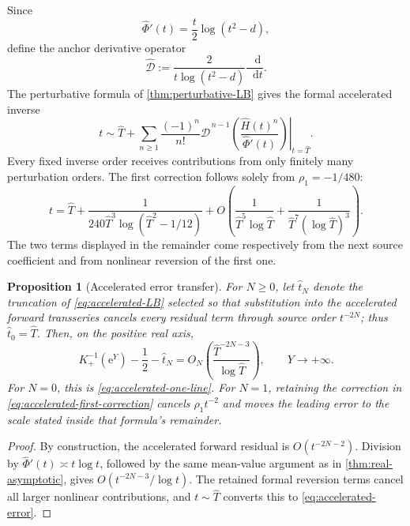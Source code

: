 \documentclass[11pt,oneside]{article}
\theoremstyle{plain}
\newtheorem{proposition}[theorem]{Proposition}
\theoremstyle{definition}
\theoremstyle{remark}
\newcommand{\e}{\mathrm{e}}
\newcommand{\dd}{\mathop{}\!\mathrm{d}}
\begin{document}
Since
\begin{equation}
 \widehat\Phi'(t)
 =\frac t2\log(t^2-d),
 \label{eq:Phihat-prime}
\end{equation}
define the anchor derivative operator
\begin{equation}
 \widehat{\mathscr D}
 :=\frac{2}{t\log(t^2-d)}\frac{\dd}{\dd t}.
 \label{eq:Dhat-def}
\end{equation}
The perturbative formula of \cref{thm:perturbative-LB} gives the formal
accelerated inverse
\begin{equation}
 t
 \sim \widehat T+
 \sum_{n\ge1}\frac{(-1)^n}{n!}
 \widehat{\mathscr D}^{\,n-1}
 \left.
 \left(
   \frac{\widehat H(t)^n}{\widehat\Phi'(t)}
 \right)\right|_{t=\widehat T}.
 \label{eq:accelerated-LB}
\end{equation}
Every fixed inverse order receives contributions from only finitely many
perturbation orders.  The first correction follows solely from
\(\rho_1=-1/480\):
\begin{equation}
 t
 =\widehat T+
 \frac{1}{240\widehat T^3\log(\widehat T^2-1/12)}
 +O\!\left(\frac{1}{\widehat T^5\log\widehat T}
           +\frac{1}{\widehat T^7(\log\widehat T)^3}\right).
 \label{eq:accelerated-first-correction}
\end{equation}
The two terms displayed in the remainder come respectively from the next
source coefficient and from nonlinear reversion of the first one.

\begin{proposition}[Accelerated error transfer]
\label{prop:accelerated-error}
For \(N\ge0\), let \(\widehat t_N\) denote the truncation of
\cref{eq:accelerated-LB} selected so that substitution into the accelerated
forward transseries cancels every residual term through source order
\(t^{-2N}\); thus \(\widehat t_0=\widehat T\).  Then, on the positive real
axis,
\begin{equation}
 K_+^{-1}(\e^Y)-\frac12-\widehat t_N
 =O_N\!\left(\frac{\widehat T^{-2N-3}}{\log\widehat T}\right),
 \qquad Y\to+\infty.
 \label{eq:accelerated-error}
\end{equation}
For \(N=0\), this is \cref{eq:accelerated-one-line}.  For \(N=1\),
retaining the correction in \cref{eq:accelerated-first-correction} cancels
\(\rho_1t^{-2}\) and moves the leading error to the scale stated inside that
formula's remainder.
\end{proposition}

\begin{proof}
By construction, the accelerated forward residual is
\(O(t^{-2N-2})\).  Division by
\(\widehat\Phi'(t)\asymp t\log t\), followed by the same mean-value argument
as in \cref{thm:real-asymptotic}, gives
\(O(t^{-2N-3}/\log t)\).  The retained formal reversion terms cancel all
larger nonlinear contributions, and \(t\sim\widehat T\) converts this to
\cref{eq:accelerated-error}.
\end{proof}
\end{document}
